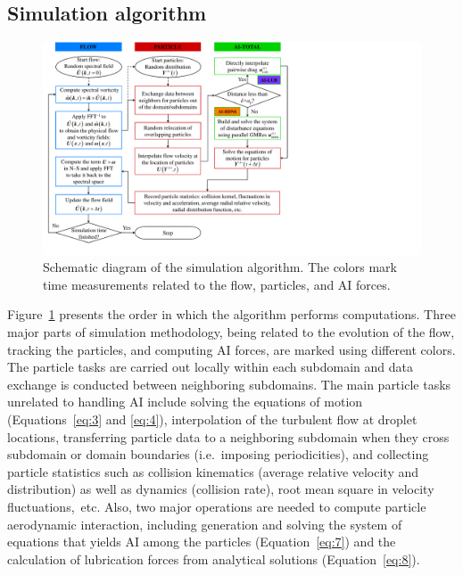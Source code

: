 \documentclass[../thesis.tex]{subfiles}
\begin{document}
\subsection{Simulation algorithm}

\begin{figure}%
\centering
\includegraphics[trim=5mm 10mm 115mm 0mm, clip, width=\textwidth]{./figs/PPAM/1/CP022_fig1.pdf}
\caption{Schematic diagram of the simulation algorithm. The colors mark time measurements related to the flow, particles, and AI forces.}
\label{alg}
\end{figure}%
Figure~\ref{alg} presents the order in which the algorithm performs computations. Three major parts of simulation methodology, being related to the evolution of the flow, tracking the particles, and computing AI forces, are marked using different colors. The particle tasks are carried out locally within each subdomain and data exchange is conducted between neighboring subdomains. The main particle tasks unrelated to handling AI include solving the equations of motion (Equations~\ref{eq:3} and \ref{eq:4}), interpolation of the turbulent flow at droplet locations, transferring particle data to a neighboring subdomain when they cross subdomain or domain boundaries (i.e.~imposing periodicities), and collecting particle statistics such as collision kinematics (average relative velocity and distribution) as well as dynamics (collision rate), root mean square in velocity fluctuations,~etc. Also, two major operations are needed to compute particle aerodynamic interaction, including generation and solving the system of equations that yields AI among the particles (Equation~\ref{eq:7}) and the calculation of lubrication forces from analytical solutions (Equation~\ref{eq:8}).
\end{document}
